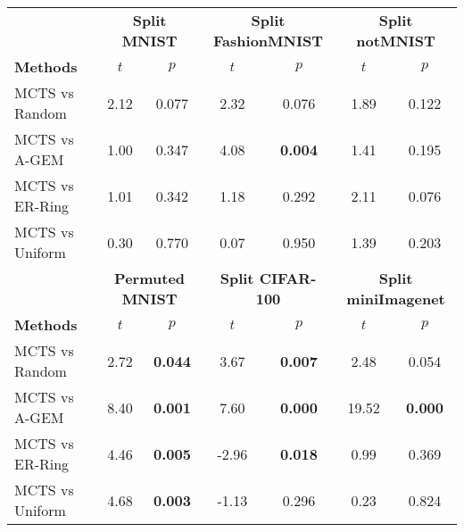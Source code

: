 \begin{tabular}{lcccccc}
\toprule
                   & \multicolumn{2}{c}{\textbf{Split MNIST}} & \multicolumn{2}{c}{\textbf{Split FashionMNIST}} & \multicolumn{2}{c}{\textbf{Split notMNIST}} \\
\cmidrule(lr){2-3} \cmidrule(lr){4-5} \cmidrule(lr){6-7}
\textbf{Methods}   & $t$                 & $p$                    & $t$                    & $p$                        & $t$                  & $p$                      \\ \midrule
MCTS vs Random     & 2.12            & 0.077           & 2.32               & 0.076               & 1.89             & 0.122             \\
MCTS vs A-GEM      & 1.00            & 0.347           & 4.08               & \textbf{0.004}               & 1.41             & 0.195             \\
MCTS vs ER-Ring    & 1.01            & 0.342           & 1.18               & 0.292               & 2.11             & 0.076             \\
MCTS vs Uniform & 0.30            & 0.770           & 0.07               & 0.950               & 1.39             & 0.203            \\
\bottomrule \toprule
                   & \multicolumn{2}{c}{\textbf{Permuted MNIST}} & \multicolumn{2}{c}{\textbf{Split CIFAR-100}} & \multicolumn{2}{c}{\textbf{Split miniImagenet}} \\
\cmidrule(lr){2-3} \cmidrule(lr){4-5} \cmidrule(lr){6-7}
\textbf{Methods}   & $t$                  & $p$                      & $t$                   & $p$                      & $t$                     & $p$                       \\ \midrule
MCTS vs Random     & 2.72             & \textbf{0.044}             & 3.67              & \textbf{0.007}             & 2.48                & 0.054              \\
MCTS vs A-GEM      & 8.40             & \textbf{0.001}             & 7.60              & \textbf{0.000}             & 19.52               & \textbf{0.000}              \\
MCTS vs ER-Ring    & 4.46             & \textbf{0.005}             & -2.96             & \textbf{0.018}             & 0.99                & 0.369              \\
MCTS vs Uniform & 4.68             & \textbf{0.003}             & -1.13             & 0.296             & 0.23                & 0.824             \\
\bottomrule
\end{tabular}